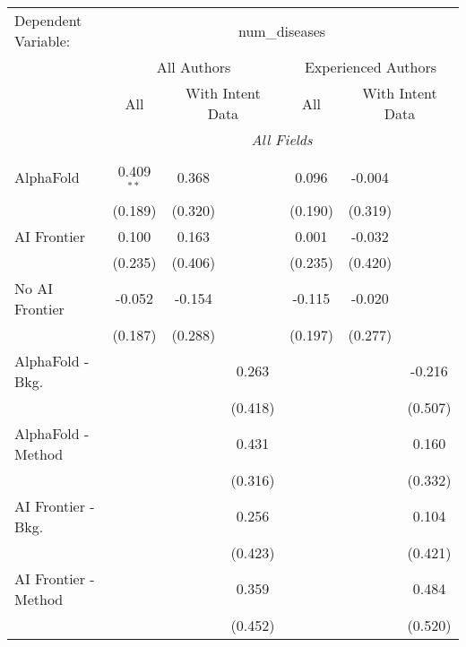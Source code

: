 \begingroup
\centering
\begin{tabular}{lcccccc}
   \tabularnewline \midrule \midrule
   Dependent Variable: & \multicolumn{6}{c}{num\_diseases}\\
 & \multicolumn{3}{c}{All Authors} & \multicolumn{3}{c}{Experienced Authors} \\
\cmidrule(lr){2-4} \cmidrule(lr){5-7}
 & \multicolumn{1}{c}{All} & \multicolumn{2}{c}{With Intent Data} & \multicolumn{1}{c}{All} & \multicolumn{2}{c}{With Intent Data} \\
\cmidrule(lr){2-2} \cmidrule(lr){3-4} \cmidrule(lr){5-5} \cmidrule(lr){6-7}
 & \multicolumn{6}{c}{\textit{All Fields}} \\ \\
   AlphaFold               & 0.409$^{**}$ & 0.368   &             & 0.096   & -0.004  &   \\   
                           & (0.189)      & (0.320) &             & (0.190) & (0.319) &   \\   
   AI Frontier             & 0.100        & 0.163   &             & 0.001   & -0.032  &   \\   
                           & (0.235)      & (0.406) &             & (0.235) & (0.420) &   \\   
   No AI Frontier          & -0.052       & -0.154  &             & -0.115  & -0.020  &   \\   
                           & (0.187)      & (0.288) &             & (0.197) & (0.277) &   \\   
   AlphaFold - Bkg.        &              &         & 0.263       &         &         & -0.216\\   
                           &              &         & (0.418)     &         &         & (0.507)\\   
   AlphaFold - Method      &              &         & 0.431       &         &         & 0.160\\   
                           &              &         & (0.316)     &         &         & (0.332)\\   
   AI Frontier - Bkg.      &              &         & 0.256       &         &         & 0.104\\   
                           &              &         & (0.423)     &         &         & (0.421)\\   
   AI Frontier - Method    &              &         & 0.359       &         &         & 0.484\\   
                           &              &         & (0.452)     &         &         & (0.520)\\   

\end{tabular}

